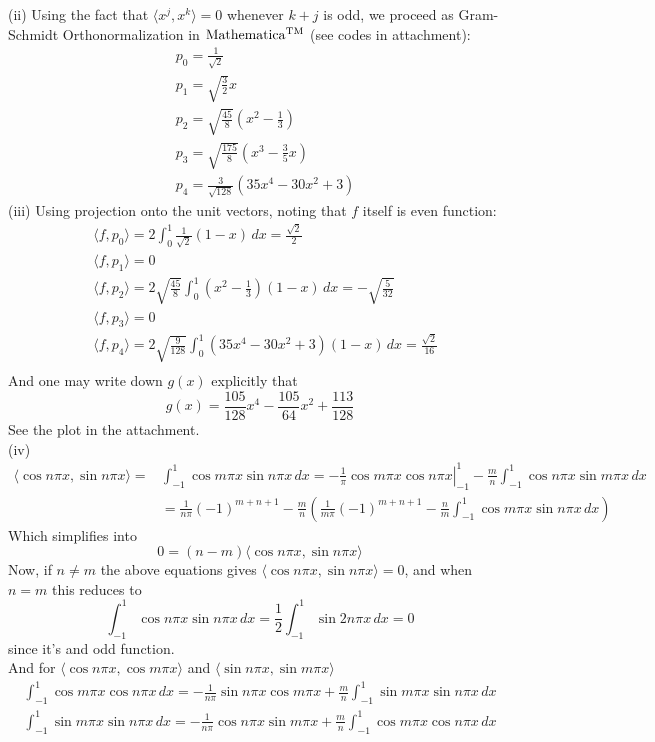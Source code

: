 \documentclass[12pt]{article}
\def\dotp#1#2{\langle#1,#2\rangle}
\begin{document}
(ii) Using the fact that $\dotp{x^j}{x^k}=0$ whenever $k+j$ is odd, we proceed as Gram-Schmidt Orthonormalization in $\rm Mathematica^{\rm TM}$ (see codes in attachment):
\begin{align*}
&p_0=\frac{1}{\sqrt{2}}\\
&p_1=\sqrt{\frac{3}{2}}x\\
&p_2=\sqrt{\frac{45}{8}}(x^2-\frac{1}{3})\\
&p_3=\sqrt{\frac{175}{8}}(x^3-\frac{3}{5}x)\\
&p_4=\frac{3}{\sqrt{128}}(35x^4-30x^2+3)
\end{align*}
(iii) Using projection onto the unit vectors, noting that $f$ itself is even function:
\begin{align*}
&\dotp{f}{p_0}=2\int_{0}^{1}\frac{1}{\sqrt2}(1-x)\,dx=\frac{\sqrt{2}}{2}\\
&\dotp{f}{p_1}=0\\
&\dotp{f}{p_2}=2\sqrt{\frac{45}{8}}\int_{0}^{1}(x^2-\frac{1}{3})(1-x)\,dx=-\sqrt{\frac{5}{32}}\\
&\dotp{f}{p_3}=0\\
&\dotp{f}{p_4}=2\sqrt{\frac{9}{128}}\int_{0}^{1}(35x^4-30x^2+3)(1-x)\,dx=\frac{\sqrt2}{16}\\
\end{align*}
And one may write down $g(x)$ explicitly that 
\[
g(x)=\frac{105}{128}x^{4}-\frac{105}{64}x^{2}+\frac{113}{128}
\]
See the plot in the attachment.\\[0.5 em]
(iv)
\begin{align*}
\dotp{\cos{n\pi x}}{\sin{n\pi x}}=
&\int_{-1}^{1}\cos{m\pi x}\sin{n\pi x}\, dx=\left.-\frac{1}{\pi}\cos m\pi x \cos n\pi x\right |_{-1}^1-\frac{m}{n}\int_{-1}^{1}\cos{n\pi x}\sin{m\pi x}\, dx\\
&=\frac{1}{n\pi}{(-1)}^{m+n+1}-\frac{m}{n}\left(\frac{1}{m\pi}{(-1)}^{m+n+1}-\frac{n}{m}\int_{-1}^{1}\cos{m\pi x}\sin{n\pi x}\, dx\right)
\end{align*}
Which simplifies into
\[
0=(n-m)\dotp{\cos{n\pi x}}{\sin{n\pi x}}
\]
Now, if $n\neq m$ the above equations gives $\dotp{\cos{n\pi x}}{\sin{n\pi x}}=0$, and when $n=m$ this reduces to
\[
\int_{-1}^{1}\cos{n\pi x}\sin{n\pi x}\, dx=\frac{1}{2}\int_{-1}^{1}\sin{2n\pi x}\, dx=0
\]
since it's and odd function.\\
And for $\dotp{\cos{n\pi x}}{\cos{m\pi x}}$ and $\dotp{\sin{n\pi x}}{\sin{m\pi x}}$
\begin{align*}
\int_{-1}^{1}\cos{m\pi x}\cos{n\pi x}\, dx=-\frac{1}{n\pi}\sin{n\pi x}\cos{m\pi x}+\frac{m}{n}\int_{-1}^{1}\sin{m\pi x}\sin{n\pi x}\, dx\\
\int_{-1}^{1}\sin{m\pi x}\sin{n\pi x}\, dx=-\frac{1}{n\pi}\cos{n\pi x}\sin{m\pi x}+\frac{m}{n}\int_{-1}^{1}\cos{m\pi x}\cos{n\pi x}\, dx
\end{align*}
\end{document}
